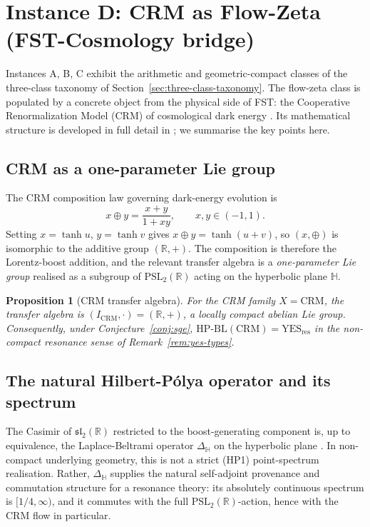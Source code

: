 \documentclass[11pt]{article}
\newtheorem{proposition}[theorem]{Proposition}
\theoremstyle{definition}
\theoremstyle{remark}
\newcommand{\HBL}{\mathrm{HP\text{-}BL}}
\newcommand{\PSL}{\mathrm{PSL}}
\begin{document}
\section{Instance D: CRM as Flow-Zeta (FST-Cosmology bridge)}
\label{sec:crm-flow}

Instances A, B, C exhibit the arithmetic and geometric-compact
classes of the three-class taxonomy of Section~\ref{sec:three-class-taxonomy}.
The flow-zeta class is populated by a concrete object from the
physical side of FST: the Cooperative Renormalization Model (CRM)
of cosmological dark energy \cite{RFEPFramework}. Its mathematical
structure is developed in full detail in \cite{CRMFlowZetaNote}; we
summarise the key points here.

\subsection{CRM as a one-parameter Lie group}

The CRM composition law governing dark-energy evolution is
\begin{equation}
\label{eq:crm-composition}
  x \oplus y = \frac{x+y}{1+xy}, \qquad x, y \in (-1, 1).
\end{equation}
Setting $x = \tanh u$, $y = \tanh v$ gives $x \oplus y = \tanh(u+v)$,
so $(x, \oplus)$ is isomorphic to the additive group $(\mathbb{R},
+)$. The composition is therefore the Lorentz-boost addition, and
the relevant transfer algebra is a \emph{one-parameter Lie group}
realised as a subgroup of $\PSL_2(\mathbb{R})$ acting on the
hyperbolic plane $\mathbb{H}$.

\begin{proposition}[CRM transfer algebra]\label{prop:crm-transfer}
For the CRM family $X = \mathrm{CRM}$, the transfer algebra is
$(I_{\mathrm{CRM}}, \cdot) = (\mathbb{R}, +)$, a locally compact
abelian Lie group. Consequently, under Conjecture~\ref{conj:sge},
$\HBL(\mathrm{CRM}) = \mathrm{YES}_{\mathrm{res}}$ in the
non-compact resonance sense of Remark~\ref{rem:yes-types}.
\end{proposition}

\subsection{The natural Hilbert-P\'olya operator and its spectrum}

The Casimir of $\mathfrak{sl}_2(\mathbb{R})$ restricted to the
boost-generating component is, up to equivalence, the
Laplace-Beltrami operator $\Delta_{\mathbb{H}}$ on the hyperbolic
plane \cite{DyatlovZworski2019}. In non-compact underlying geometry,
this is not a strict (HP1) point-spectrum realisation. Rather,
$\Delta_{\mathbb{H}}$ supplies the natural self-adjoint provenance
and commutation structure for a resonance theory: its absolutely
continuous spectrum is $[1/4, \infty)$, and it commutes with the full
$\PSL_2(\mathbb{R})$-action, hence with the CRM flow in particular.
\end{document}
